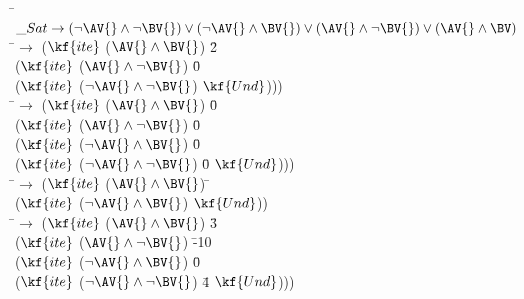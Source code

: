 \begin{subfigure}[t]{\textwidth}
  \begin{tabbing}
  \hquad \= $\_Sat \rightarrow (\neg \AV{} \wedge \neg \BV{}) \vee (\neg \AV{} \wedge \BV{}) \vee (\AV{} \wedge \neg \BV{}) \vee (\AV{} \wedge \BV)$ \\
  \> \iV{}\quad\hspace{1.7ex}\=$\rightarrow$ ($\kf{ite}$ ($\AV{} \wedge \BV{}$)\; \=2 \\
  \> \> \> ($\kf{ite}$\; ($\AV{} \wedge \neg \BV{}$)\; \=0 \\
  \> \> \> \> ($\kf{ite}$\; ($\neg \AV{} \wedge \neg \BV{}$) $\kf{Und}$))) \\

  \> \cV{}\quad\hspace{1.7ex}\=$\rightarrow$ ($\kf{ite}$ ($\AV{} \wedge \BV{}$)\; \=0 \\
  \> \> \> ($\kf{ite}$\; ($\AV{} \wedge \neg \BV{}$)\; \=0 \\
  \> \> \> \> ($\kf{ite}$\; ($\neg \AV{} \wedge \BV{}$)\; \=0  \\
  \> \> \> \> \> ($\kf{ite}$\; ($\neg \AV{} \wedge \neg \BV{}$)\; \=0 $\kf{Und}$))) \\

  \> \aV{}\quad\hspace{1.7ex}\=$\rightarrow$ ($\kf{ite}$ ($ \AV{} \wedge \BV{}$)\; \=\tru{} \\
  \> \> \> ($\kf{ite}$ ($\neg \AV{} \wedge \BV{}$) \fls{} $\kf{Und}$))\\


  \> \bV{}\quad\hspace{1.7ex}\=$\rightarrow$ ($\kf{ite}$ ($\AV{} \wedge \BV{}$)\; \=3 \\
  \> \> \> ($\kf{ite}$\; ($\AV{} \wedge \neg \BV{}$)\; \=-10 \\
  \> \> \> \> ($\kf{ite}$\; ($\neg \AV{} \wedge \BV{}$)\; \=0  \\
  \> \> \> \> \> ($\kf{ite}$\; ($\neg \AV{} \wedge \neg \BV{}$)\; \=4 $\kf{Und}$))) \\
\end{tabbing}
\end{subfigure}
